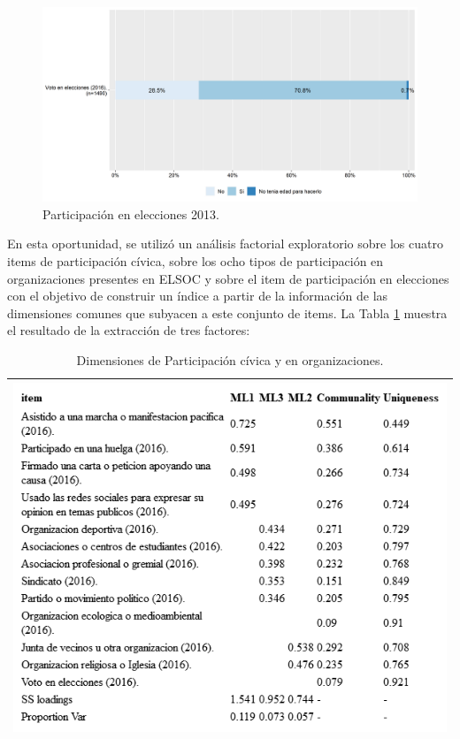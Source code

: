 \documentclass[
  12pt,
]{book}
\begin{document}
\begin{figure}[H]

{\centering \includegraphics[width=1\linewidth,height=1\textheight]{output/graphs/participacion-electoral} 

}

\caption{Participación en elecciones 2013.}\label{fig:participacion-electoral}
\end{figure}

En esta oportunidad, se utilizó un análisis factorial exploratorio sobre los cuatro items de participación cívica, sobre los ocho tipos de participación en organizaciones presentes en ELSOC y sobre el item de participación en elecciones con el objetivo de construir un índice a partir de la información de las dimensiones comunes que subyacen a este conjunto de items. La Tabla \ref{tab:participacion-fa} muestra el resultado de la extracción de tres factores:

\begin{longtable}[]{@{}l@{}}
\caption{\label{tab:participacion-fa}Dimensiones de Participación cívica y en organizaciones.}\tabularnewline
\toprule
\endhead
\includegraphics[width=8.33333in,height=\textheight]{output/tables/participacion_fa.png} \\
\bottomrule
\end{longtable}
\end{document}
